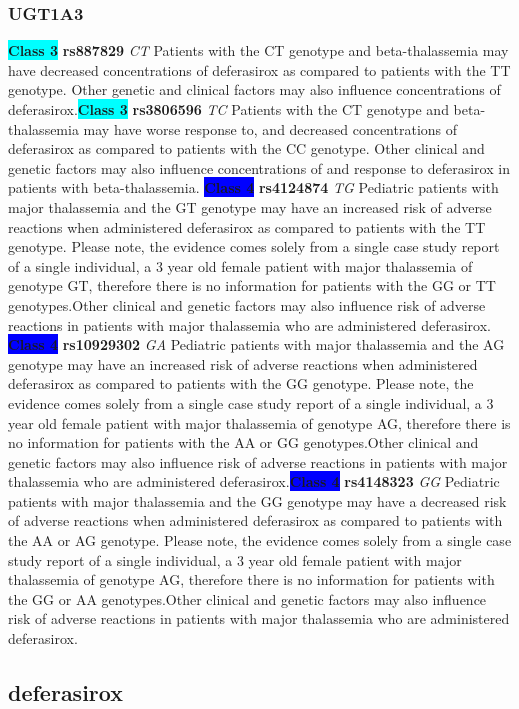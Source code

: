 \documentclass{book}
\begin{document}
\subsubsection{ UGT1A3 }

\begin{center}
\textbf{\colorbox{cyan} {Class 3}} \textbf{ rs887829 } \textit{ CT }
Patients with the CT genotype and beta-thalassemia may have decreased concentrations of deferasirox as compared to patients with the TT genotype. Other genetic and clinical factors may also influence concentrations of deferasirox.\textbf{\colorbox{cyan} {Class 3}} \textbf{ rs3806596 } \textit{ TC }
Patients with the CT genotype and beta-thalassemia may have worse response to, and decreased concentrations of deferasirox as compared to patients with the CC genotype. Other clinical and genetic factors may also influence concentrations of and response to deferasirox in patients with beta-thalassemia.
\textbf{\colorbox{blue} {Class 4}} \textbf{ rs4124874 } \textit{ TG }
Pediatric patients with major thalassemia and the GT genotype may have an increased risk of adverse reactions when administered deferasirox as compared to patients with the TT genotype. Please note, the evidence comes solely from a single case study report of a single individual, a 3 year old female patient with major thalassemia of genotype GT, therefore there is no information for patients with the GG or TT genotypes.Other clinical and genetic factors may also influence risk of adverse reactions in patients with major thalassemia who are administered deferasirox. \textbf{\colorbox{blue} {Class 4}} \textbf{ rs10929302 } \textit{ GA }
Pediatric patients with major thalassemia and the AG genotype may have an increased risk of adverse reactions when administered deferasirox as compared to patients with the GG genotype. Please note, the evidence comes solely from a single case study report of a single individual, a 3 year old female patient with major thalassemia of genotype AG, therefore there is no information for patients with the AA or GG genotypes.Other clinical and genetic factors may also influence risk of adverse reactions in patients with major thalassemia who are administered deferasirox.\textbf{\colorbox{blue} {Class 4}} \textbf{ rs4148323 } \textit{ GG }
Pediatric patients with major thalassemia and the GG genotype may have a decreased risk of adverse reactions when administered deferasirox as compared to patients with the AA or AG genotype. Please note, the evidence comes solely from a single case study report of a single individual, a 3 year old female patient with major thalassemia of genotype AG, therefore there is no information for patients with the GG or AA genotypes.Other clinical and genetic factors may also influence risk of adverse reactions in patients with major thalassemia who are administered deferasirox.

\end{center}\subsection{ deferasirox }
\end{document}
